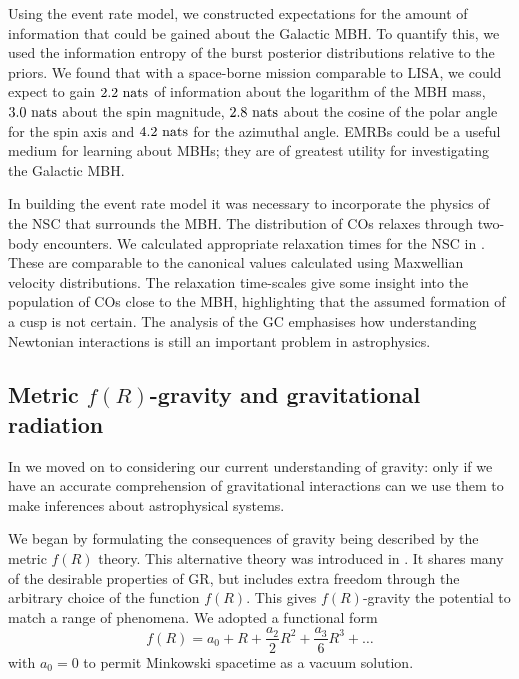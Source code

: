 Using the event rate model, we constructed expectations for the amount of information that could be gained about the Galactic MBH. To quantify this, we used the information entropy of the burst posterior distributions relative to the priors. We found that with a space-borne mission comparable to LISA, we could expect to gain $2.2~\mathrm{nats}$ of information about the logarithm of the MBH mass, $3.0~\mathrm{nats}$ about the spin magnitude, $2.8~\mathrm{nats}$ about the cosine of the polar angle for the spin axis and $4.2~\mathrm{nats}$ for the azimuthal angle. EMRBs could be a useful medium for learning about MBHs; they are of greatest utility for investigating the Galactic MBH.

In building the event rate model it was necessary to incorporate the physics of the NSC that surrounds the MBH. The distribution of COs relaxes through two-body encounters. We calculated appropriate relaxation times for the NSC in . These are comparable to the canonical values calculated using Maxwellian velocity distributions. The relaxation time-scales give some insight into the population of COs close to the MBH, highlighting that the assumed formation of a cusp is not certain. The analysis of the GC emphasises how understanding Newtonian interactions is still an important problem in astrophysics.

\subsection{Metric $f(R)$-gravity and gravitational radiation}\label{sec:Review-f-R}

In  we moved on to considering our current understanding of gravity: only if we have an accurate comprehension of gravitational interactions can we use them to make inferences about astrophysical systems.

We began by formulating the consequences of gravity being described by the metric $f(R)$ theory. This alternative theory was introduced in . It shares many of the desirable properties of GR, but includes extra freedom through the arbitrary choice of the function $f(R)$. This gives $f(R)$-gravity the potential to match a range of phenomena. We adopted a functional form
\begin{equation}
f(R) = a_0 + R + \frac{a_2}{2}R^2 + \frac{a_3}{6}R^3 + \ldots
\end{equation}
with $a_0 = 0$ to permit Minkowski spacetime as a vacuum solution.

